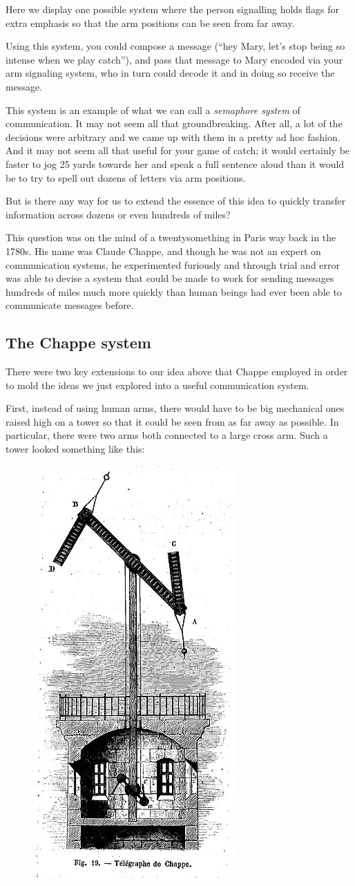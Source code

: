 \documentclass{book}
\begin{document}
Here we display one possible system where the person signalling holds flags for extra emphasis so that the arm positions can be seen from far away.

Using this system, you could compose a message (``hey Mary, let's stop being so intense when we play catch''), and pass that message to Mary encoded via your arm signaling system, who in turn could decode it and in doing so receive the message.

This system is an example of what we can call a \emph{semaphore system} of communication. It may not seem all that groundbreaking. After all, a lot of the decisions were arbitrary and we came up with them in a pretty ad hoc fashion. And it may not seem all that useful for your game of catch; it would certainly be faster to jog 25 yards towards her and speak a full sentence aloud than it would be to try to spell out dozens of letters via arm positions.

But is there any way for us to extend the essence of this idea to quickly transfer information across dozens or even hundreds of miles? 

This question was on the mind of a twentysomething in Paris way back in the 1780s. His name was Claude Chappe, and though he was not an expert on communication systems, he experimented furiously and through trial and error was able to devise a system that could be made to work for sending messages hundreds of miles much more quickly than human beings had ever been able to communicate messages before.

\subsection{The Chappe system}

There were two key extensions to our idea above that Chappe employed in order to mold the ideas we just explored into a useful communication system.

First, instead of using human arms, there would have to be big mechanical ones raised high on a tower so that it could be seen from as far away as possible. In particular, there were two arms both connected to a large cross arm. Such a tower looked something like this:

\begin{figure}[H]
\centering
\includegraphics[width=0.3\linewidth]{chappe_tower}
\end{figure}
\end{document}

